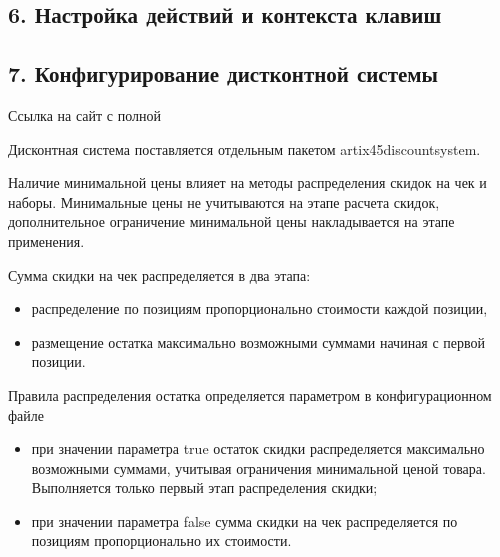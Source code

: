 \documentclass[a4paper,10pt,russian]{report}
\begin{document}
\subsection{6. Настройка действий и контекста клавиш}
\label{\detokenize{additional:id6}}
\begin{figure}[htbp]
\centering

\noindent{}
\end{figure}


\subsection{7. Конфигурирование дистконтной системы}
\label{\detokenize{additional:id7}}
\sphinxAtStartPar
Ссылка на сайт с полной 

\sphinxAtStartPar
Дисконтная система поставляется отдельным пакетом artix45\sphinxhyphen{}discountsystem.

\sphinxAtStartPar
Наличие минимальной цены влияет на методы распределения скидок на чек и наборы.
Минимальные цены не учитываются на этапе расчета скидок, дополнительное ограничение минимальной цены накладывается на этапе применения.

\sphinxAtStartPar
Сумма скидки на чек распределяется в два этапа:
\begin{itemize}
\item {} 
\sphinxAtStartPar
распределение по позициям пропорционально стоимости каждой позиции,

\item {} 
\sphinxAtStartPar
размещение остатка максимально возможными суммами начиная с первой позиции.

\end{itemize}

\sphinxAtStartPar
Правила распределения остатка определяется параметром  в конфигурационном файле 
\begin{itemize}
\item {} 
\sphinxAtStartPar
при значении параметра true остаток скидки распределяется максимально возможными суммами, учитывая ограничения минимальной ценой товара. Выполняется только первый этап распределения скидки;

\item {} 
\sphinxAtStartPar
при значении параметра false сумма скидки на чек распределяется по позициям пропорционально их стоимости.

\end{itemize}
\end{document}
